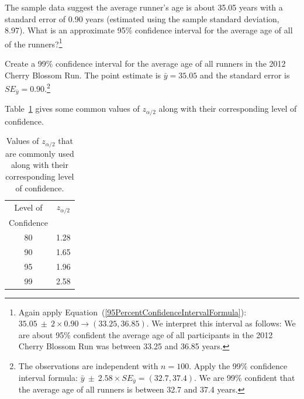 \begin{exercise} \label{95CIExerciseForAgeOfRun10Samp1}
The sample data suggest the average runner's age is about 35.05 years with a standard error of 0.90 years (estimated using the sample standard deviation, 8.97). What is an approximate 95\% confidence interval for the average age of all of the runners?\footnote{Again apply Equation~(\ref{95PercentConfidenceIntervalFormula}): $35.05 \ \pm \ 2\times 0.90 \rightarrow (33.25, 36.85)$. We interpret this interval as follows: We are about 95\% confident the average age of all participants in the 2012 Cherry Blossom Run was between 33.25 and 36.85 years.}
\end{exercise}


\begin{exercise} \label{find99CIForRun10AgeExercise}
Create a 99\% confidence interval for the average age of all runners in the 2012 Cherry Blossom Run. The point estimate is $\bar{y} = 35.05$ and the standard error is $SE_{\bar{y}} = 0.90$.\footnote{The observations are independent 
with $n=100$.
Apply the 99\% confidence interval formula: $\bar{y}\ \pm\ 2.58 \times  SE_{\bar{y}} = (32.7, 37.4)$. We are 99\% confident that the average age of all runners is between 32.7 and 37.4 years.}
\end{exercise}



Table~\ref{tableCommonValuesOfZAlpha} gives some common values of 
$z_{\alpha/2}$ along with their corresponding level of confidence.

\begin{table}[H]
\centering
\begin{tabular}{c | c}
\hline
Level of 		& $z_{\alpha/2}$	\\
Confidence	&				\\
\hline
80			&	1.28		\\
90			&	1.65		\\
95			&	1.96		\\
99			&	2.58		\\
\hline
\end{tabular}
\caption{Values of $z_{\alpha/2}$ that are commonly used along with their corresponding level of confidence.}
\label{tableCommonValuesOfZAlpha}
\end{table}

